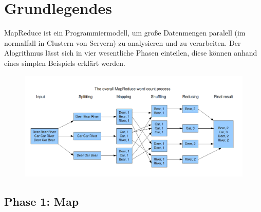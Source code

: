 \chapter{Grundlegendes}

MapReduce ist ein Programmiermodell, um große Datenmengen paralell (im normalfall in Clustern von Servern) zu analysieren und zu verarbeiten. Der Alogrithmus lässt sich in vier wesentliche Phasen einteilen, diese können anhand eines simplen Beispiels erklärt  werden.

\begin{figure}[!h]
	\centering
	\includegraphics[width=\linewidth]{images/Phases.png}
	\caption{}
	\label{robotino_urdf}
\end{figure}

\section{Phase 1: Map}


